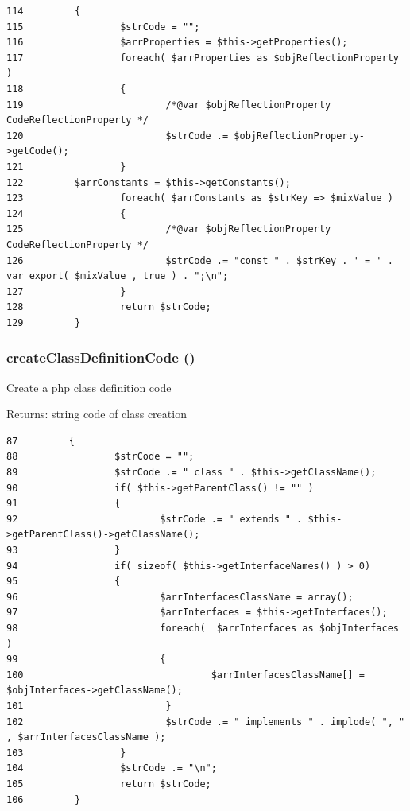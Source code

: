 \begin{Code}\begin{verbatim}114         {
115                 $strCode = "";
116                 $arrProperties = $this->getProperties();
117                 foreach( $arrProperties as $objReflectionProperty )
118                 {
119                         /*@var $objReflectionProperty CodeReflectionProperty */
120                         $strCode .= $objReflectionProperty->getCode();
121                 }
122         $arrConstants = $this->getConstants();
123                 foreach( $arrConstants as $strKey => $mixValue )
124                 {
125                         /*@var $objReflectionProperty CodeReflectionProperty */
126                         $strCode .= "const " . $strKey . ' = ' . var_export( $mixValue , true ) . ";\n";
127                 }
128                 return $strCode;
129         }
\end{verbatim}
\end{Code}


\hypertarget{class_code_reflection_class_98b016c8a77c458803bb6905c89c914b}{
\subsubsection[{createClassDefinitionCode}]{\setlength{\rightskip}{0pt plus 5cm}createClassDefinitionCode ()}}
\label{class_code_reflection_class_98b016c8a77c458803bb6905c89c914b}


Create a php class definition code

\begin{Desc}
\item[Returns:]string code of class creation \end{Desc}


\begin{Code}\begin{verbatim}87         {
88                 $strCode = "";
89                 $strCode .= " class " . $this->getClassName();
90                 if( $this->getParentClass() != "" )
91                 {
92                         $strCode .= " extends " . $this->getParentClass()->getClassName();
93                 }
94                 if( sizeof( $this->getInterfaceNames() ) > 0)
95                 {
96                         $arrInterfacesClassName = array();
97                         $arrInterfaces = $this->getInterfaces();
98                         foreach(  $arrInterfaces as $objInterfaces )
99                         {
100                                 $arrInterfacesClassName[] = $objInterfaces->getClassName();
101                         }
102                         $strCode .= " implements " . implode( ", " , $arrInterfacesClassName );
103                 }
104                 $strCode .= "\n";
105                 return $strCode;
106         }
\end{verbatim}
\end{Code}


